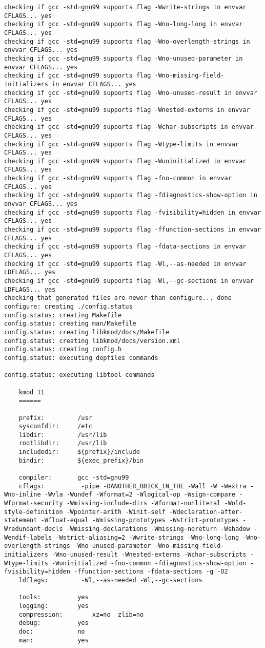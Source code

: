 \documentclass[11pt,a4paper]{article}
\begin{document}
{\begin{shaded}
\begin{verbatim}
checking if gcc -std=gnu99 supports flag -Wwrite-strings in envvar CFLAGS... yes
checking if gcc -std=gnu99 supports flag -Wno-long-long in envvar CFLAGS... yes
checking if gcc -std=gnu99 supports flag -Wno-overlength-strings in envvar CFLAGS... yes
checking if gcc -std=gnu99 supports flag -Wno-unused-parameter in envvar CFLAGS... yes
checking if gcc -std=gnu99 supports flag -Wno-missing-field-initializers in envvar CFLAGS... yes
checking if gcc -std=gnu99 supports flag -Wno-unused-result in envvar CFLAGS... yes
checking if gcc -std=gnu99 supports flag -Wnested-externs in envvar CFLAGS... yes
checking if gcc -std=gnu99 supports flag -Wchar-subscripts in envvar CFLAGS... yes
checking if gcc -std=gnu99 supports flag -Wtype-limits in envvar CFLAGS... yes
checking if gcc -std=gnu99 supports flag -Wuninitialized in envvar CFLAGS... yes
checking if gcc -std=gnu99 supports flag -fno-common in envvar CFLAGS... yes
checking if gcc -std=gnu99 supports flag -fdiagnostics-show-option in envvar CFLAGS... yes
checking if gcc -std=gnu99 supports flag -fvisibility=hidden in envvar CFLAGS... yes
checking if gcc -std=gnu99 supports flag -ffunction-sections in envvar CFLAGS... yes
checking if gcc -std=gnu99 supports flag -fdata-sections in envvar CFLAGS... yes
checking if gcc -std=gnu99 supports flag -Wl,--as-needed in envvar LDFLAGS... yes
checking if gcc -std=gnu99 supports flag -Wl,--gc-sections in envvar LDFLAGS... yes
checking that generated files are newer than configure... done
configure: creating ./config.status
config.status: creating Makefile
config.status: creating man/Makefile
config.status: creating libkmod/docs/Makefile
config.status: creating libkmod/docs/version.xml
config.status: creating config.h
config.status: executing depfiles commands

config.status: executing libtool commands

    kmod 11
    ======

    prefix:         /usr
    sysconfdir:     /etc
    libdir:         /usr/lib
    rootlibdir:     /usr/lib
    includedir:     ${prefix}/include
    bindir:         ${exec_prefix}/bin

    compiler:       gcc -std=gnu99
    cflags:          -pipe -DANOTHER_BRICK_IN_THE -Wall -W -Wextra -Wno-inline -Wvla -Wundef -Wformat=2 -Wlogical-op -Wsign-compare -Wformat-security -Wmissing-include-dirs -Wformat-nonliteral -Wold-style-definition -Wpointer-arith -Winit-self -Wdeclaration-after-statement -Wfloat-equal -Wmissing-prototypes -Wstrict-prototypes -Wredundant-decls -Wmissing-declarations -Wmissing-noreturn -Wshadow -Wendif-labels -Wstrict-aliasing=2 -Wwrite-strings -Wno-long-long -Wno-overlength-strings -Wno-unused-parameter -Wno-missing-field-initializers -Wno-unused-result -Wnested-externs -Wchar-subscripts -Wtype-limits -Wuninitialized -fno-common -fdiagnostics-show-option -fvisibility=hidden -ffunction-sections -fdata-sections -g -O2
    ldflags:         -Wl,--as-needed -Wl,--gc-sections 

    tools:          yes
    logging:        yes
    compression:        xz=no  zlib=no
    debug:          yes
    doc:            no
    man:            yes
\end{verbatim}\end{shaded}}
\end{document}
